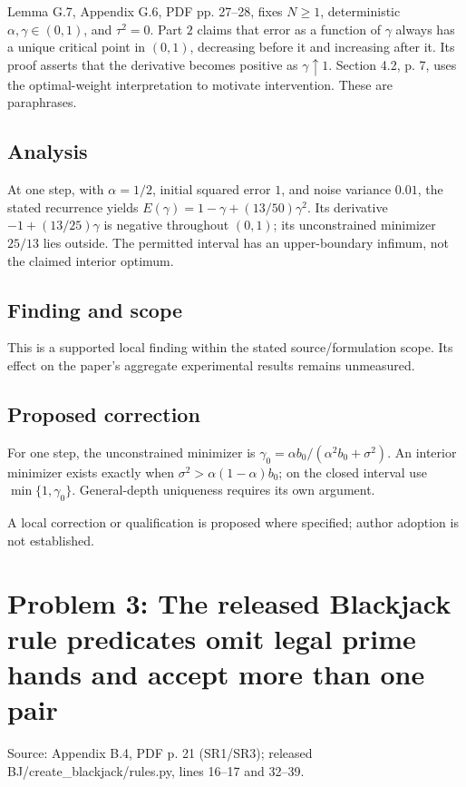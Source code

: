 \documentclass[11pt]{article}
\begin{document}
Lemma G.7, Appendix G.6, PDF pp. 27–28, fixes \(N\geq1\), deterministic \(\alpha,\gamma\in(0,1)\), and \(\tau^2=0\). Part \(2\) claims that error as a function of \(\gamma\) always has a unique critical point in \((0,1)\), decreasing before it and increasing after it. Its proof asserts that the derivative becomes positive as \(\gamma\uparrow1\). Section 4.2, p. 7, uses the optimal-weight interpretation to motivate intervention. These are paraphrases.

\subsection*{Analysis}

At one step, with \(\alpha=1/2\), initial squared error \(1\), and noise variance \(0.01\), the stated recurrence yields \(E(\gamma)=1-\gamma+(13/50)\gamma^2\). Its derivative \(-1+(13/25)\gamma\) is negative throughout \((0,1)\); its unconstrained minimizer \(25/13\) lies outside. The permitted interval has an upper-boundary infimum, not the claimed interior optimum.

\subsection*{Finding and scope}

This is a supported local finding within the stated source/formulation scope. Its effect on the paper's aggregate experimental results remains unmeasured.

\subsection*{Proposed correction}

For one step, the unconstrained minimizer is \(\gamma_0=\alpha b_0/(\alpha^2b_0+\sigma^2)\). An interior minimizer exists exactly when \(\sigma^2>\alpha(1-\alpha)b_0\); on the closed interval use \(\min\{1,\gamma_0\}\). General-depth uniqueness requires its own argument.

A local correction or qualification is proposed where specified; author adoption is not established.

\section*{Problem 3: The released Blackjack rule predicates omit legal prime hands and accept more than one pair}

Source: Appendix B.4, PDF p. 21 (SR1/SR3); released BJ/create\_blackjack/rules.py, lines 16–17 and 32–39.
\end{document}
